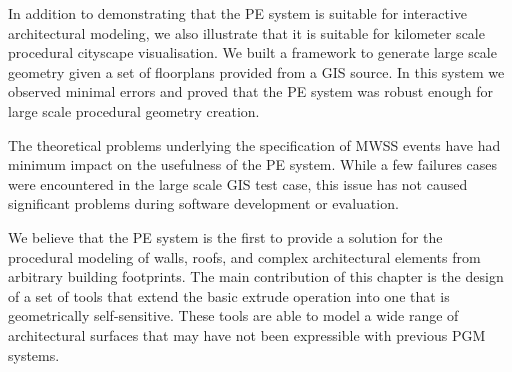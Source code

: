 In addition to demonstrating that the PE system is suitable for interactive architectural modeling, we also illustrate that it is suitable for kilometer scale procedural cityscape visualisation. We built a framework to generate large scale geometry given a set of floorplans provided from a GIS source. In this system we observed minimal errors and proved that the PE system was robust enough for large scale procedural geometry creation.





The theoretical problems underlying the specification of MWSS events have had minimum impact on the usefulness of the PE system. While a few failures cases were encountered in the large scale GIS test case, this issue has not caused significant problems during software development or evaluation.

We believe that the PE system is the first to provide a solution for the procedural modeling of walls, roofs, and complex architectural elements from arbitrary building footprints. The main contribution of this chapter is the design of a set of tools that extend the basic extrude operation into one that is geometrically self-sensitive. These tools are able to model a wide range of architectural surfaces that may have not been expressible with previous PGM systems.

